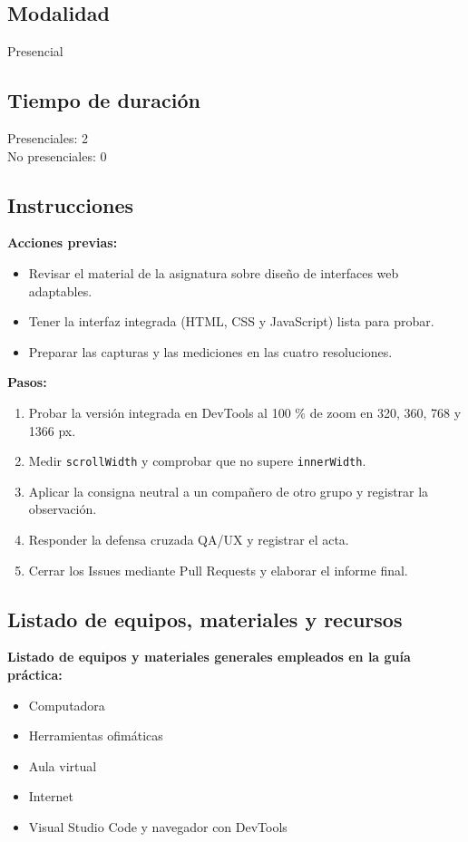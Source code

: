 \documentclass{article}
\begin{document}
\subsection{Modalidad}
Presencial

\subsection{Tiempo de duración}
Presenciales: 2\\
No presenciales: 0

\subsection{Instrucciones}
\textbf{Acciones previas:}
\begin{itemize}
    \item Revisar el material de la asignatura sobre diseño de interfaces web adaptables.
    \item Tener la interfaz integrada (HTML, CSS y JavaScript) lista para probar.
    \item Preparar las capturas y las mediciones en las cuatro resoluciones.
\end{itemize}

\textbf{Pasos:}
\begin{enumerate}
    \item Probar la versión integrada en DevTools al 100 \% de zoom en 320, 360, 768 y 1366 px.
    \item Medir \texttt{scrollWidth} y comprobar que no supere \texttt{innerWidth}.
    \item Aplicar la consigna neutral a un compañero de otro grupo y registrar la observación.
    \item Responder la defensa cruzada QA/UX y registrar el acta.
    \item Cerrar los Issues mediante Pull Requests y elaborar el informe final.
\end{enumerate}

\subsection{Listado de equipos, materiales y recursos}
\textbf{Listado de equipos y materiales generales empleados en la guía práctica:}
\begin{itemize}
    \item Computadora
    \item Herramientas ofimáticas
    \item Aula virtual
    \item Internet
    \item Visual Studio Code y navegador con DevTools
\end{itemize}
\end{document}
